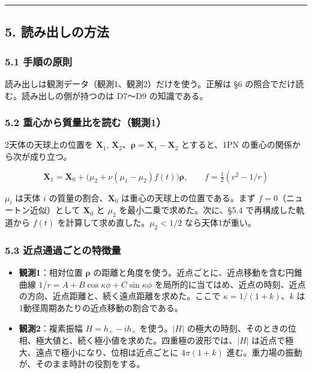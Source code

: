 \documentclass[
  a4paper,
]{ltjsarticle}
\providecommand{\tightlist}{%
  \setlength{\itemsep}{0pt}\setlength{\parskip}{0pt}}
\begin{document}
\begin{center}\rule{0.5\linewidth}{0.5pt}\end{center}

\subsection{5.
読み出しの方法}\label{ux8aadux307fux51faux3057ux306eux65b9ux6cd5}

\subsubsection{5.1 手順の原則}\label{ux624bux9806ux306eux539fux5247}

読み出しは観測データ（観測1、観測2）だけを使う。正解は §6
の照合でだけ読む。読み出しの側が持つのは D7〜D9 の知識である。

\subsubsection{5.2
重心から質量比を読む（観測1）}\label{ux91cdux5fc3ux304bux3089ux8ceaux91cfux6bd4ux3092ux8aadux3080ux89b3ux6e2c1}

2天体の天球上の位置を \(\mathbf X_1\),
\(\mathbf X_2\)、\(\boldsymbol\rho=\mathbf X_1-\mathbf X_2\)
とすると、1PN の重心の関係から次が成り立つ。

\[
\mathbf X_1=\mathbf X_0+\bigl(\mu_2+\nu(\mu_1-\mu_2)f(t)\bigr)\boldsymbol\rho,\qquad f=\tfrac12\left(v^2-1/r\right)
\]

\(\mu_i\) は天体 \(i\) の質量の割合、\(\mathbf X_0\)
は重心の天球上の位置である。まず \(f=0\)（ニュートン近似）として
\(\mathbf X_0\) と \(\mu_2\) を最小二乗で求めた。次に、§5.4
で再構成した軌道から \(f(t)\) を計算して求め直した。\(\mu_2<1/2\)
なら天体1が重い。

\subsubsection{5.3
近点通過ごとの特徴量}\label{ux8fd1ux70b9ux901aux904eux3054ux3068ux306eux7279ux5fb4ux91cf}

\begin{itemize}
\tightlist
\item
  \textbf{観測1}：相対位置 \(\boldsymbol\rho\)
  の距離と角度を使う。近点ごとに、近点移動を含む円錐曲線
  \(1/r=A+B\cos\kappa\phi+C\sin\kappa\phi\)
  を局所的に当てはめ、近点の時刻、近点の方向、近点距離と、続く遠点距離を求めた。ここで
  \(\kappa=1/(1+k)\)、\(k\) は1動径周期あたりの近点移動の割合である。
\item
  \textbf{観測2}：複素振幅 \(H=h_+-ih_\times\) を使う。\(|H|\)
  の極大の時刻、そのときの位相、極大値と、続く極小値を求めた。四重極の波形では、\(|H|\)
  は近点で極大、遠点で極小になり、位相は近点ごとに \(4\pi(1+k)\)
  進む。重力場の振動が、そのまま時計の役割をする。
\end{itemize}
\end{document}
